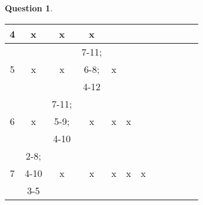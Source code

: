 \documentclass[11pt,a4paper,dvipsnames]{article}
\theoremstyle{definition}%
\newtheorem{Q}{Question}[] %
\begin{document}
\begin{Q}
{\begin{center}
\begin{tabular}{|c|c|c|c|c|c|c|c|c|c|c|c|}
				4 & x & x & x & \cellcolor{gray!20} & \cellcolor{gray!20} & \cellcolor{gray!20} & \cellcolor{gray!20} & \cellcolor{gray!20} & \cellcolor{gray!20} & \cellcolor{gray!20} & \cellcolor{gray!20}\\ \hline
				\multirow{3}{*}{5} & \multirow{3}{*}{x} & \multirow{3}{*}{x} & \cellcolor{red!25}7-11; & \multirow{3}{*}{x} & \cellcolor{gray!20} & \cellcolor{gray!20} & \cellcolor{gray!20} & \cellcolor{gray!20} & \cellcolor{gray!20} & \cellcolor{gray!20} & \cellcolor{gray!20}\\
				 &  &  & \cellcolor{red!25}6-8; &  & \cellcolor{gray!20} &  \cellcolor{gray!20}&  \cellcolor{gray!20}& \cellcolor{gray!20} & \cellcolor{gray!20} & \cellcolor{gray!20} & \cellcolor{gray!20}\\
				 &  &  & \cellcolor{red!25}4-12 &  & \cellcolor{gray!20} &  \cellcolor{gray!20}& \cellcolor{gray!20} & \cellcolor{gray!20} & \cellcolor{gray!20} & \cellcolor{gray!20} & \cellcolor{gray!20}\\ \hline
				\multirow{3}{*}{6} & \multirow{3}{*}{x} & \cellcolor{green!25}7-11; & \multirow{3}{*}{x} & \multirow{3}{*}{x} & \multirow{3}{*}{x} & \cellcolor{gray!20} &\cellcolor{gray!20}  & \cellcolor{gray!20} & \cellcolor{gray!20} & \cellcolor{gray!20} & \cellcolor{gray!20}\\
				 &  & \cellcolor{green!25}5-9; &  &  &  & \cellcolor{gray!20} &  \cellcolor{gray!20}&  \cellcolor{gray!20}& \cellcolor{gray!20} & \cellcolor{gray!20} & \cellcolor{gray!20}\\
				 &  & \cellcolor{green!25}4-10 &  &  &  & \cellcolor{gray!20} & \cellcolor{gray!20} &\cellcolor{gray!20}  & \cellcolor{gray!20} & \cellcolor{gray!20} &\cellcolor{gray!20}\\ \hline
				\multirow{3}{*}{7} & \cellcolor{red!25}2-8; & \multirow{3}{*}{x} & \multirow{3}{*}{x} & \multirow{3}{*}{x} & \multirow{3}{*}{x} & \multirow{3}{*}{x} & \cellcolor{gray!20} &  \cellcolor{gray!20}&  \cellcolor{gray!20}& \cellcolor{gray!20} & \cellcolor{gray!20}\\
				 & \cellcolor{red!25}4-10 &  & & &  &  & \cellcolor{gray!20} & \cellcolor{gray!20} & \cellcolor{gray!20} & \cellcolor{gray!20} & \cellcolor{gray!20}\\
				 & \cellcolor{red!25}3-5 & & & &  &  & \cellcolor{gray!20} &\cellcolor{gray!20}  & \cellcolor{gray!20} & \cellcolor{gray!20} &\cellcolor{gray!20} \\ \hline

\end{tabular}
\end{center}}
\end{Q}
\end{document}
